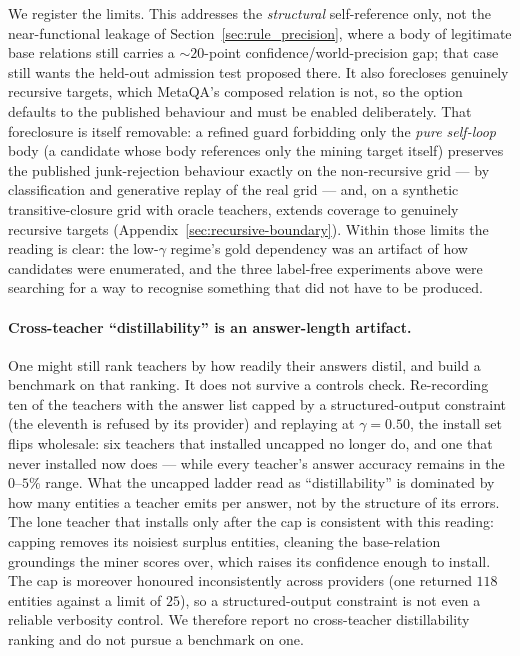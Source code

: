 \documentclass[11pt]{article}
\theoremstyle{plain}
\begin{document}
We register the limits. This addresses the \emph{structural} self-reference only,
not the near-functional leakage of Section~\ref{sec:rule_precision}, where a body of
legitimate base relations still carries a $\sim\!20$-point confidence/world-precision
gap; that case still wants the held-out admission test proposed there. It also
forecloses genuinely recursive targets, which MetaQA's composed relation is not,
so the option defaults to the published behaviour and must be enabled
deliberately. That foreclosure is itself removable: a refined guard forbidding
only the \emph{pure self-loop} body (a candidate whose body references only
the mining target itself) preserves the published junk-rejection behaviour
exactly on the
non-recursive grid --- by classification and generative replay of the real
grid --- and, on a synthetic transitive-closure grid with oracle teachers,
extends coverage to genuinely recursive targets
(Appendix~\ref{sec:recursive-boundary}).
Within those limits the reading is clear: the low-$\gamma$ regime's
gold dependency was an artifact of how candidates were enumerated, and the three
label-free experiments above were searching for a way to recognise something that
did not have to be produced.

\paragraph{Cross-teacher ``distillability'' is an answer-length artifact.} One
might still rank teachers by how readily their answers distil, and build a
benchmark on that ranking. It does not survive a controls check. Re-recording
ten of the teachers with the answer list capped by a structured-output
constraint (the eleventh is refused by its provider) and replaying at
$\gamma{=}0.50$, the install set flips wholesale: six teachers that installed
uncapped no longer do, and one that never installed now does --- while every
teacher's answer accuracy remains in the $0$--$5\%$ range. What the uncapped ladder read
as ``distillability'' is dominated by how many entities a teacher emits per
answer, not by the structure of its errors. The lone teacher that installs only
after the cap is consistent with this reading: capping removes its noisiest
surplus entities, cleaning the base-relation groundings the miner scores over,
which raises its confidence enough to install. The cap is moreover honoured
inconsistently across providers (one returned $118$ entities against a limit of
$25$), so a structured-output constraint is not even a reliable verbosity
control. We therefore report no cross-teacher distillability ranking and do not
pursue a benchmark on one.
\end{document}
